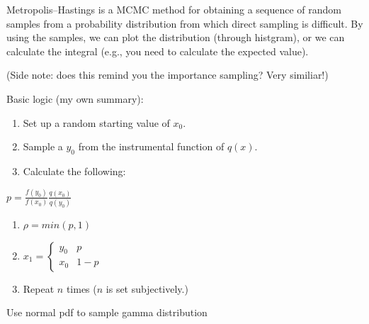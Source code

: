 \documentclass[]{book}
\begin{document}
Metropolis--Hastings is a MCMC method for obtaining a sequence of random samples from a probability distribution from which direct sampling is difficult. By using the samples, we can plot the distribution (through histgram), or we can calculate the integral (e.g., you need to calculate the expected value).

(Side note: does this remind you the importance sampling? Very similiar!)

Basic logic (my own summary):

\begin{enumerate}
\def\labelenumi{(\arabic{enumi})}
\item
  Set up a random starting value of \(x_0\).
\item
  Sample a \(y_0\) from the instrumental function of \(q(x)\).
\item
  Calculate the following:
\end{enumerate}

\(p =\frac{f(y_0)}{f(x_0)}\frac{q(x_0)}{q(y_0)}\)

\begin{enumerate}
\def\labelenumi{(\arabic{enumi})}
\setcounter{enumi}{3}
\item
  \(\rho=min(p, 1)\)
\item
  \(x_{1}=\begin{cases} y_0 & p \\ x_0 & 1-p \end{cases}\)
\item
  Repeat \(n\) times (\(n\) is set subjectively.)
\end{enumerate}

Use normal pdf to sample gamma distribution
\end{document}
